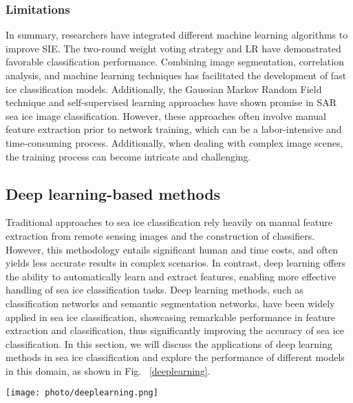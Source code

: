 \subsubsection {Limitations}

In summary, researchers have integrated different machine learning algorithms to improve SIE. The two-round weight voting strategy and LR have demonstrated favorable classification performance. Combining image segmentation, correlation analysis, and machine learning techniques has facilitated the development of fast ice classification models. Additionally, the Gaussian Markov Random Field technique and self-supervised learning approaches have shown promise in SAR sea ice image classification. However, these approaches often involve manual feature extraction prior to network training, which can be a labor-intensive and time-consuming process. Additionally, when dealing with complex image scenes, the training process can become intricate and challenging.


\subsection {Deep learning-based methods}
Traditional approaches to sea ice classification rely heavily on manual feature extraction from remote sensing images and the construction of classifiers. However, this methodology entails significant human and time costs, and often yields less accurate results in complex scenarios. In contrast, deep learning offers the ability to automatically learn and extract features, enabling more effective handling of sea ice classification tasks. Deep learning methods, such as classification networks and semantic segmentation networks, have been widely applied in sea ice classification, showcasing remarkable performance in feature extraction and classification, thus significantly improving the accuracy of sea ice classification. In this section, we will discuss the applications of deep learning methods in sea ice classification and explore the performance of different models in this domain, as shown in Fig.~ \ref{deeplearning}.

\begin{figure*}[!tbh]
  \begin{center}
  \texttt{[image: photo/deeplearning.png]}\\
  \caption{Chronological overview of the most relevant deep learning-based SIE methods.}\label{deeplearning}
  \end{center}
\end{figure*}

